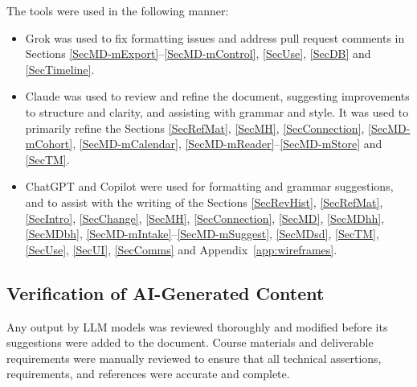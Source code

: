 \documentclass[12pt, titlepage]{article}
\begin{document}
The tools were used in the following manner:
\begin{itemize}
    \item Grok was used to fix formatting issues and address pull request comments
    in Sections \ref{SecMD-mExport}--\ref{SecMD-mControl}, \ref{SecUse}, \ref{SecDB} and \ref{SecTimeline}.
    \item Claude was used to review and refine the document, suggesting
    improvements to structure and clarity, and assisting with grammar and style. It
    was used to primarily refine the Sections \ref{SecRefMat}, \ref{SecMH}, \ref{SecConnection}, \ref{SecMD-mCohort}, \ref{SecMD-mCalendar}, \ref{SecMD-mReader}--\ref{SecMD-mStore} and \ref{SecTM}.
    \item ChatGPT and Copilot were used for formatting and grammar suggestions, and
    to assist with the writing of the Sections \ref{SecRevHist}, \ref{SecRefMat}, \ref{SecIntro}, \ref{SecChange}, \ref{SecMH}, \ref{SecConnection}, \ref{SecMD}, \ref{SecMDhh}, \ref{SecMDbh}, \ref{SecMD-mIntake}--\ref{SecMD-mSuggest}, \ref{SecMDsd}, \ref{SecTM}, \ref{SecUse}, \ref{SecUI}, \ref{SecComms} and Appendix~\ref{app:wireframes}.
\end{itemize}

\subsection{Verification of AI-Generated Content}

Any output by LLM models was reviewed thoroughly and modified before its suggestions were added to the document. Course materials and deliverable requirements were manually reviewed to ensure that all technical assertions, requirements, and references were accurate and complete.
\end{document}
